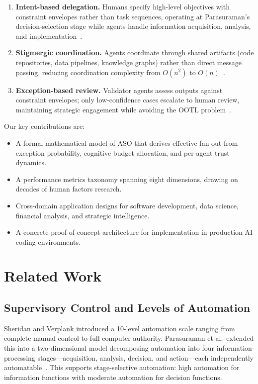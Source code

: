 \documentclass[11pt]{article}
\begin{document}
\begin{enumerate}[label=(\roman*),leftmargin=*]
    \item \textbf{Intent-based delegation.} Humans specify high-level objectives with constraint envelopes rather than task sequences, operating at Parasuraman's decision-selection stage while agents handle information acquisition, analysis, and implementation~\cite{parasuraman2000model}.
    \item \textbf{Stigmergic coordination.} Agents coordinate through shared artifacts (code repositories, data pipelines, knowledge graphs) rather than direct message passing, reducing coordination complexity from $O(n^2)$ to $O(n)$~\cite{crowston2006stigmergy,heylighen2016stigmergy,li2025swarmsys}.
    \item \textbf{Exception-based review.} Validator agents assess outputs against constraint envelopes; only low-confidence cases escalate to human review, maintaining strategic engagement while avoiding the OOTL problem~\cite{parasuraman2000model,chen2025trust}.
\end{enumerate}

Our key contributions are:
\begin{itemize}[leftmargin=*]
    \item A formal mathematical model of ASO that derives effective fan-out from exception probability, cognitive budget allocation, and per-agent trust dynamics.
    \item A performance metrics taxonomy spanning eight dimensions, drawing on decades of human factors research.
    \item Cross-domain application designs for software development, data science, financial analysis, and strategic intelligence.
    \item A concrete proof-of-concept architecture for implementation in production AI coding environments.
\end{itemize}

\section{Related Work}

\subsection{Supervisory Control and Levels of Automation}

Sheridan and Verplank introduced a 10-level automation scale ranging from complete manual control to full computer authority. Parasuraman et al.\ extended this into a two-dimensional model decomposing automation into four information-processing stages---acquisition, analysis, decision, and action---each independently automatable~\cite{parasuraman2000model}. This supports stage-selective automation: high automation for information functions with moderate automation for decision functions.
\end{document}

